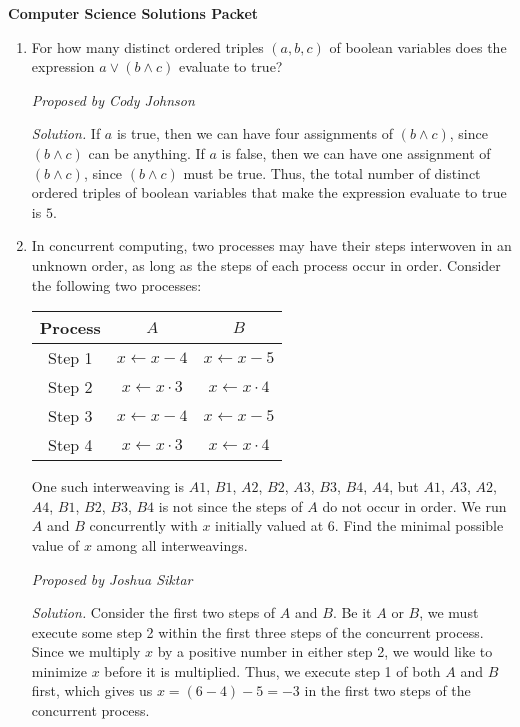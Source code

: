 \documentclass[10pt]{article}
\newcommand{\proposed}[1]
{
\vspace{5pt}
\noindent\textit{Proposed by #1}
}
\newcommand{\solution}
{
\vspace{5pt}
\noindent\textit{Solution.}\qquad
}
\begin{document}
\begin{center}
\huge\textbf{Computer Science Solutions Packet}\normalsize

\vspace{3pt}
\end{center}

\begin{enumerate}
\setlength{\itemsep}{3pt}

\item For how many distinct ordered triples $(a,b,c)$ of boolean variables does the expression $a \lor (b \land c)$ evaluate to true?

\proposed{Cody Johnson}

\solution If $a$ is true, then we can have four assignments of $(b \land c)$, since $(b \land c)$ can be anything. If $a$ is false, then we can have one assignment of $(b \land c)$, since $(b \land c)$ must be true. Thus, the total number of distinct ordered triples of boolean variables that make the expression evaluate to true is $\boxed{5}$. 

\item In concurrent computing, two processes may have their steps interwoven in an unknown order, as long as the steps of each process occur in order. Consider the following two processes:

\begin{center}
\begin{tabular}{c|cc}
Process & $A$ & $B$\\
\hline
Step 1 & $x\leftarrow x-4$ & $x\leftarrow x-5$\\
Step 2 & $x\leftarrow x\cdot3$ & $x\leftarrow x\cdot4$\\
Step 3 & $x\leftarrow x-4$ & $x\leftarrow x-5$\\
Step 4 & $x\leftarrow x\cdot3$ & $x\leftarrow x\cdot4$
\end{tabular}
\end{center}

One such interweaving is $A1$, $B1$, $A2$, $B2$, $A3$, $B3$, $B4$, $A4$, but $A1$, $A3$, $A2$, $A4$, $B1$, $B2$, $B3$, $B4$ is not since the steps of $A$ do not occur in order. We run $A$ and $B$ concurrently with $x$ initially valued at $6$. Find the minimal possible value of $x$ among all interweavings.

\proposed{Joshua Siktar}

\solution Consider the first two steps of $A$ and $B$. Be it $A$ or $B$, we must execute some step 2 within the first three steps of the concurrent process. Since we multiply $x$ by a positive number in either step 2, we would like to minimize $x$ before it is multiplied. Thus, we execute step 1 of both $A$ and $B$ first, which gives us $x = (6-4)-5 = -3$ in the first two steps of the concurrent process. 


\end{enumerate}
\end{document}
